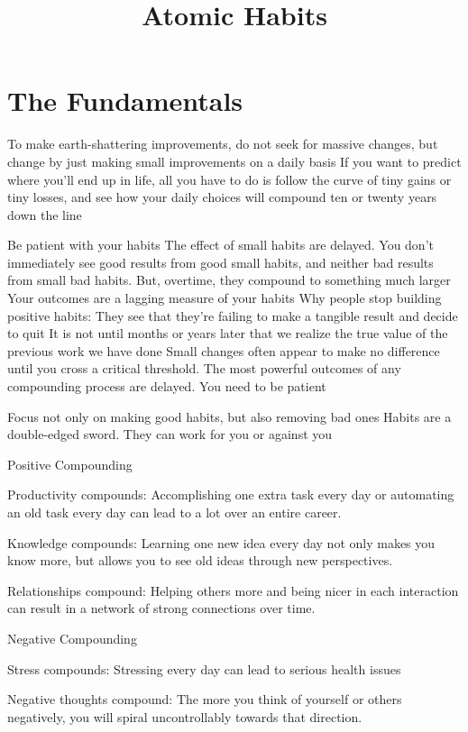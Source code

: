\documentclass[10pt,twocolumn]{../notes}
\title{Atomic Habits}
\begin{document}
\maketitle
\tableofcontents
\section{The Fundamentals}
\Advice To make earth-shattering improvements, do not seek for massive changes, but change by just making small improvements on a daily basis
\Quote If you want to predict where you’ll end up in life, all you have to do is follow the curve of tiny gains or tiny losses, and see how your daily choices will compound ten or twenty years down the line

\Advice Be patient with your habits
\Fact The effect of small habits are delayed. You don’t immediately see good results from good small habits, and neither bad results from small bad habits. But, overtime, they compound to something much larger
\Quote Your outcomes are a lagging measure of your habits
\Fact Why people stop building positive habits: They see that they’re failing to make a tangible result and decide to quit
\Quote It is not until months or years later that we realize the true value of the previous work we have done
\Quote Small changes often appear to make no difference until you cross a critical threshold. The most powerful outcomes of any compounding process are delayed. You need to be patient


\Advice Focus not only on making good habits, but also removing bad ones
\Quote Habits are a double-edged sword. They can work for you or against you
\begin{List}{Positive Compounding}
  \item Productivity compounds: Accomplishing one extra task every day or automating an old task every day can lead to a lot over an entire career.
  \item Knowledge compounds: Learning one new idea every day not only makes you know more, but allows you to see old ideas through new perspectives.
  \item Relationships compound: Helping others more and being nicer in each interaction can result in a network of strong connections over time.
\end{List}

\begin{List}{Negative Compounding}
\item Stress compounds: Stressing every day can lead to serious health issues
\item Negative thoughts compound: The more you think of yourself or others negatively, you will spiral uncontrollably towards that direction.
\end{List}
\end{document}
